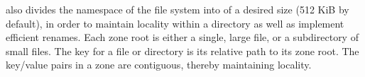 \betrfs also divides the namespace of the file system into  of a
desired size (512 KiB by default), in order to maintain locality within a
directory as well as implement efficient renames.  Each zone root is either a
single, large file, or a subdirectory of small files.
The key for a file or directory is its relative path to its zone root. The
key/value pairs in a zone are contiguous, thereby maintaining locality.






